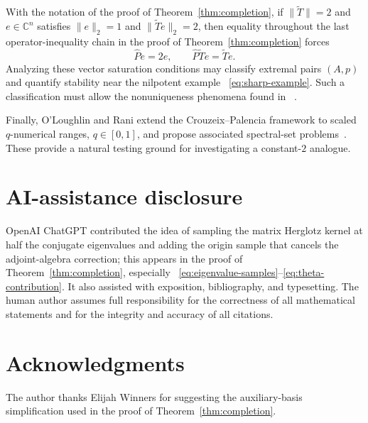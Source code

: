 \documentclass[preprints,article,submit,oneauthor]{Definitions/mdpi}
\theoremstyle{mdpi}
\theoremstyle{definition}
\newcommand{\C}{\mathbb C}
\begin{document}
With the notation of the proof of Theorem~\ref{thm:completion},
if $\lVert\widetilde T\rVert=2$ and $e\in\C^n$ satisfies
$\lVert e\rVert_2=1$ and $\lVert\widetilde Te\rVert_2=2$, then equality
throughout the last
operator-inequality chain in the proof of
Theorem~\ref{thm:completion} forces
\[
  \widehat Pe=2e,
  \qquad
  \widehat P\widetilde Te=\widetilde Te.
\]
Analyzing these vector saturation conditions may classify extremal
pairs $(A,p)$ and quantify stability near the nilpotent example~%
\eqref{eq:sharp-example}.  Such a
classification must allow the nonuniqueness phenomena found in~%
\cite{Li2020}.

Finally, O'Loughlin and Rani extend the Crouzeix--Palencia framework to
scaled $q$-numerical ranges, $q\in[0,1]$, and propose associated
spectral-set problems~\cite{OLoughlinRani2026}.  These provide a natural
testing ground for investigating a constant-$2$ analogue.

\section*{AI-assistance disclosure}

OpenAI ChatGPT contributed the idea of sampling the matrix Herglotz
kernel at half the conjugate eigenvalues and adding the origin sample
that cancels the adjoint-algebra correction; this appears in the proof
of Theorem~\ref{thm:completion}, especially~%
\eqref{eq:eigenvalue-samples}--\eqref{eq:theta-contribution}.  It also
assisted with exposition, bibliography, and typesetting.  The human
author assumes full responsibility for the correctness of all
mathematical statements and for the integrity and accuracy of all
citations.

\section*{Acknowledgments}

The author thanks Elijah Winners for suggesting the auxiliary-basis
simplification used in the proof of
Theorem~\ref{thm:completion}.


\end{document}
